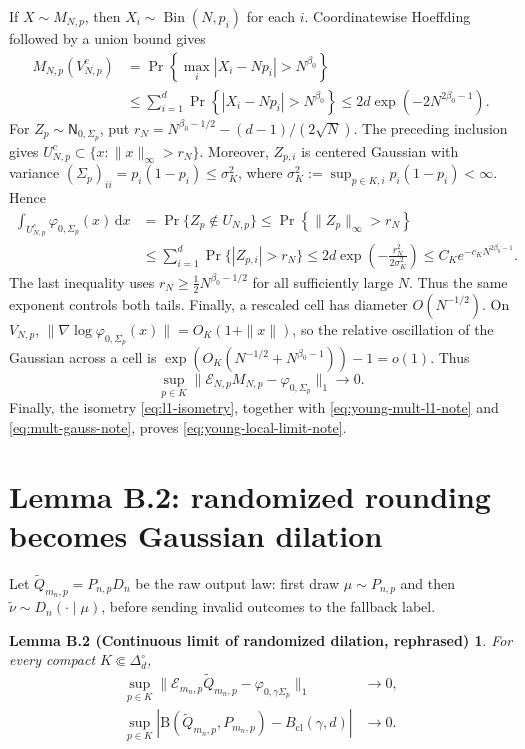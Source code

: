 \documentclass[11pt]{article}
\newcommand{\dd}{\,\mathrm d}
\newcommand{\B}{\mathrm B}
\newcommand{\Bcl}{B_{\mathrm{cl}}}
\newtheorem*{lemmaBtwo}{Lemma B.2 (Continuous limit of randomized dilation,
rephrased)}
\begin{document}
If $X\sim M_{N,p}$, then $X_i\sim\operatorname{Bin}(N,p_i)$ for each
$i$.  Coordinatewise Hoeffding followed by a union bound gives
\[
\begin{aligned}
  M_{N,p}(V_{N,p}^c)
  &=\Pr\!\left\{\max_i|X_i-Np_i|>N^{\beta_0}\right\}\\
  &\le\sum_{i=1}^d
       \Pr\!\left\{|X_i-Np_i|>N^{\beta_0}\right\}
   \le 2d\exp\!\left(-2N^{2\beta_0-1}\right).
\end{aligned}
\]
For $Z_p\sim\mathsf N_{0,\Sigma_p}$, put
$r_N=N^{\beta_0-1/2}-(d-1)/(2\sqrt N)$.  The preceding inclusion gives
$U_{N,p}^c\subset\{x:\|x\|_\infty>r_N\}$.  Moreover,
$Z_{p,i}$ is centered Gaussian with variance
$(\Sigma_p)_{ii}=p_i(1-p_i)\le\sigma_K^2$, where
$\sigma_K^2:=\sup_{p\in K,i}p_i(1-p_i)<\infty$.  Hence
\[
\begin{aligned}
  \int_{U_{N,p}^c}\varphi_{0,\Sigma_p}(x)\dd x
  &=\Pr\{Z_p\notin U_{N,p}\}
   \le\Pr\!\left\{\|Z_p\|_\infty>r_N\right\}\\
  &\le\sum_{i=1}^d\Pr\{|Z_{p,i}|>r_N\}
   \le 2d\exp\!\left(-\frac{r_N^2}{2\sigma_K^2}\right)
   \le C_K e^{-c_KN^{2\beta_0-1}}.
\end{aligned}
\]
The last inequality uses
$r_N\ge\tfrac12N^{\beta_0-1/2}$ for all sufficiently large $N$.
Thus the same exponent controls both tails.  Finally, a rescaled cell has
diameter $O(N^{-1/2})$.  On $V_{N,p}$,
$\|\nabla\log\varphi_{0,\Sigma_p}(x)\|=O_K(1+\|x\|)$, so the relative
oscillation of the Gaussian across a cell is
$\exp(O_K(N^{-1/2}+N^{\beta_0-1}))-1=o(1)$.
Thus
\begin{equation}\label{eq:mult-gauss-note}
  \sup_{p\in K}
  \|\mathcal E_{N,p}M_{N,p}-\varphi_{0,\Sigma_p}\|_1
  \longrightarrow0.
\end{equation}
Finally, the isometry \eqref{eq:l1-isometry}, together with
\eqref{eq:young-mult-l1-note} and \eqref{eq:mult-gauss-note}, proves
\eqref{eq:young-local-limit-note}.

\section{Lemma B.2: randomized rounding becomes Gaussian dilation}

Let $\widetilde Q_{m_n,p}=P_{n,p}D_n$ be the raw output law: first draw
$\mu\sim P_{n,p}$ and then
$\widetilde\nu\sim D_n(\cdot\mid\mu)$, before sending invalid outcomes to
the fallback label.

\begin{lemmaBtwo}
For every compact $K\Subset\Delta_d^\circ$,
\begin{align}
  \sup_{p\in K}
  \|\mathcal E_{m_n,p}\widetilde Q_{m_n,p}
     -\varphi_{0,\gamma\Sigma_p}\|_1
  &\longrightarrow0,
  \label{eq:rounded-limit-note}\\
  \sup_{p\in K}
  \left|\B(\widetilde Q_{m_n,p},P_{m_n,p})
        -\Bcl(\gamma,d)\right|
  &\longrightarrow0.
  \label{eq:rounded-affinity-note}
\end{align}
\end{lemmaBtwo}
\end{document}

